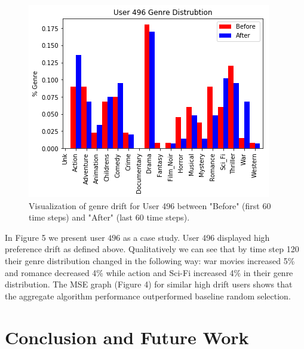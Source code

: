 \documentclass{article}
\begin{document}
\begin{figure}[ht]

\begin{center}
\centerline{\includegraphics[width=\columnwidth]{drift_histogram}}
\caption{Visualization of genre drift for User 496 between "Before" (first 60 time steps) and "After" (last 60 time steps).}
\label{drift_histogram}
\end{center}

\vskip -0.2in
\end{figure}

In Figure 5 we present user $496$ as a case study. User 496 displayed high preference drift as defined above. Qualitatively we can see that by time step 120 their genre distribution changed in the following way: war movies increased 5\% and romance decreased 4\% while action and Sci-Fi increased 4\% in their genre distribution. The MSE graph (Figure 4) for similar high drift users shows that the aggregate algorithm performance outperformed baseline random selection.  

\section{Conclusion and Future Work}

\nocite{kawale2015efficient}
\nocite{wang2017online}
\nocite{zhao2013interactive}
\nocite{cherkassky2013sequential}
\nocite{arulampalam2002tutorial}
\nocite{douc2005comparison}
\nocite{doucet2009tutorial}
\nocite{orhan2012particle}
\nocite{lo2017temporal}
\nocite{lindsten2015rao}



\end{document}
